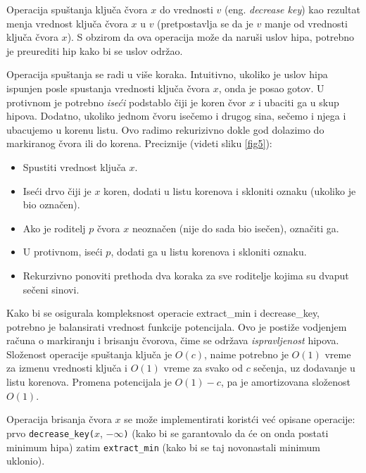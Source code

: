 \documentclass[a4paper]{article}
\theoremstyle{plain}
\theoremstyle{definition}
\begin{document}
Operacija spu\v{s}tanja klju\v{c}a \v{c}vora $x$ do vrednosti $v$ (eng. \emph{decrease key}) kao rezultat menja vrednost klju\v{c}a \v{c}vora $x$ u $v$ (pretpostavlja se da je $v$  manje od vrednosti klju\v{c}a \v{c}vora $x$). S obzirom da ova operacija mo\v{z}e da naru\v{s}i uslov hipa, potrebno je preurediti hip kako bi se uslov odr\v{zao}.

Operacija spu\v{s}tanja se radi u vi\v{s}e koraka. Intuitivno, ukoliko je uslov hipa ispunjen posle spu{s}tanja vrednosti klju\v{c}a \v{c}vora $x$, onda je posao gotov. U protivnom je potrebno \emph{ise\'c{}i} podstablo \v{c}iji je koren \v{c}vor $x$ i ubaciti ga u skup hipova. Dodatno, ukoliko jednom \v{c}voru ise\v{c}emo i drugog sina, se\v{c}emo i njega i ubacujemo u korenu listu. Ovo radimo rekurizivno dokle god dolazimo do markiranog \v{c}vora ili do korena. Preciznije (videti sliku \ref{fig5}):
\begin{itemize}
    \item Spustiti vrednost klju\v{c}a $x$.
    \item Ise\'c{}i drvo \v{c}iji je $x$ koren, dodati u listu korenova i skloniti oznaku (ukoliko je bio ozna\v{c}en).
    \item Ako je roditelj $p$ \v{c}vora $x$ neozna\v{c}en (nije do sada bio ise\v{c}en), ozna\v{c}iti ga.
    \item U protivnom, ise\'{c}i $p$, dodati ga u listu korenova i skloniti oznaku.
    \item Rekurzivno ponoviti prethoda dva koraka za sve roditelje kojima su dvaput se\v{c}eni sinovi. 
\end{itemize}

Kako bi se osigurala kompleksnost operacie extract_min i decrease_key, potrebno je balansirati vrednost funkcije potencijala. Ovo je posti\v{z}e vodjenjem ra\v{c}una o markiranju i brisanju \v{c}vorova, \v{c}ime se odr\v{z}ava \emph{ispravljenost} hipova.
Slo\v{z}enost operacije spu\v{s}tanja klju\v{c}a je $O(c)$, naime potrebno je $O(1)$ vreme za izmenu vrednosti klju\v{c}a i $O(1)$ vreme za svako od $c$ se\v{c}enja, uz dodavanje u listu korenova. Promena potencijala je $O(1) - c$, pa je amortizovana slo\v{z}enost $O(1)$.

Operacija brisanja \v{c}vora $x$ se mo\v{z}e implementirati korist\'c{}i ve\'c{} opisane operacije: prvo \texttt{decrease\_key(}$x$, $-\infty$\texttt{)}  (kako bi se garantovalo da \'c{}e on onda postati minimum hipa) zatim \texttt{extract\_min} (kako bi se taj novonastali minimum uklonio).
\end{document}
